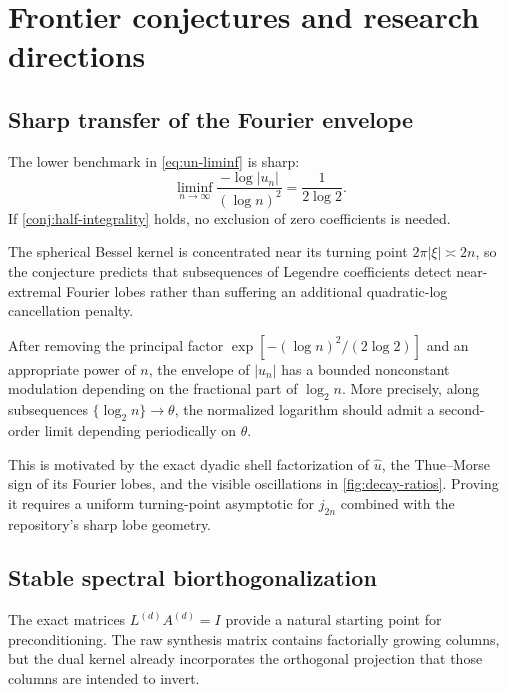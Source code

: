 \documentclass[11pt,oneside]{article}
\numberwithin{equation}{section}
\theoremstyle{definition}
\theoremstyle{remark}
\begin{document}
\section{Frontier conjectures and research directions}
\label{sec:frontiers}

\subsection{Sharp transfer of the Fourier envelope}

\begin{conjecture}
\label{conj:sharp-log-square}
The lower benchmark in \eqref{eq:un-liminf} is sharp:
\begin{equation}
 \boxed{
 \liminf_{n\to\infty}
 \frac{-\log|u_n|}{(\log n)^2}
 =\frac1{2\log2}.}
 \label{eq:conj-sharp-log-square}
\end{equation}
If \cref{conj:half-integrality} holds, no exclusion of zero coefficients is
needed.
\end{conjecture}

The spherical Bessel kernel is concentrated near its turning point
$2\pi|\xi|\asymp2n$, so the conjecture predicts that subsequences of Legendre
coefficients detect near-extremal Fourier lobes rather than suffering an
additional quadratic-log cancellation penalty.

\begin{conjecture}
\label{conj:dyadic-modulation}
After removing the principal factor
$\exp[-(\log n)^2/(2\log2)]$ and an appropriate power of $n$, the envelope of
$|u_n|$ has a bounded nonconstant modulation depending on the fractional part
of $\log_2 n$.  More precisely, along subsequences
$\{\log_2 n\}\to\theta$, the normalized logarithm should admit a second-order
limit depending periodically on $\theta$.
\end{conjecture}

This is motivated by the exact dyadic shell factorization of $\widehat u$, the
Thue--Morse sign of its Fourier lobes, and the visible oscillations in
\cref{fig:decay-ratios}.  Proving it requires a uniform turning-point
asymptotic for $j_{2n}$ combined with the repository's sharp lobe geometry.

\subsection{Stable spectral biorthogonalization}

The exact matrices $L^{(d)}A^{(d)}=I$ provide a natural starting point for
preconditioning.  The raw synthesis matrix contains factorially growing
columns, but the dual kernel already incorporates the orthogonal projection
that those columns are intended to invert.
\end{document}
